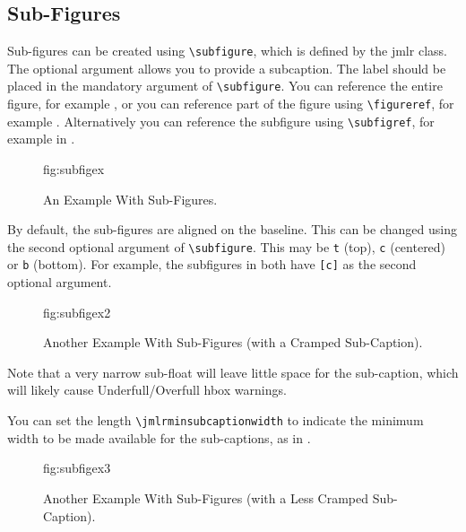 \documentclass[pmlr]{jmlr}%
\begin{document}
\subsection{Sub-Figures}
\label{sec:subfigures}

Sub-figures can be created using \verb|\subfigure|, which is
defined by the \textsf{jmlr} class. The optional argument allows
you to provide a subcaption. The label should be placed in the
mandatory argument of \verb|\subfigure|. You can reference the
entire figure, for example , or you can
reference part of the figure using \verb|\figureref|, for example
. Alternatively you can reference the
subfigure using \verb|\subfigref|, for example
 in .

\begin{figure}[htbp]
\floatconts
  {fig:subfigex}
  {\caption{An Example With Sub-Figures.}}
  {%
    \qquad
  }
\end{figure}

By default, the sub-figures are aligned on the baseline.
This can be changed using the second optional argument
of \verb|\subfigure|. This may be \texttt{t} (top), \texttt{c}
(centered) or \texttt{b} (bottom). For example, the subfigures
 in 
both have \verb|[c]| as the second optional argument.

\begin{figure}[htbp]
\floatconts
  {fig:subfigex2}
  {\caption{Another Example With Sub-Figures (with a Cramped
    Sub-Caption).}}
  {%
    \qquad
  }%
\end{figure}

Note that a very narrow sub-float will leave little space for the
sub-caption, which will likely cause Underfull/Overfull hbox warnings.

You can set the length \verb|\jmlrminsubcaptionwidth| to indicate
the minimum width to be made available for the sub-captions, as in
.

\begin{figure}[htbp]
\floatconts
  {fig:subfigex3}
  {\caption{Another Example With Sub-Figures (with a Less Cramped
    Sub-Caption).}}
  {\setlength{\jmlrminsubcaptionwidth}{0.2\linewidth}%
    \qquad
  }%
\end{figure}
\end{document}

